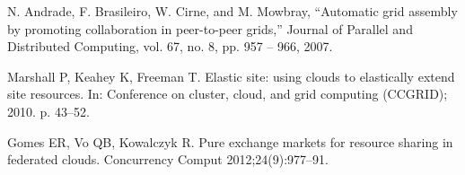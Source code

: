 \documentclass{article}
\begin{document}
\begin{thebibliography}{9}

N. Andrade, F. Brasileiro, W. Cirne, and M. Mowbray, “Automatic grid
assembly by promoting collaboration in peer-to-peer grids,” Journal of
Parallel and Distributed Computing, vol. 67, no. 8, pp. 957 – 966, 2007.

Marshall P, Keahey K, Freeman T. Elastic site: using clouds to elastically extend site resources. In: Conference on cluster, cloud, and grid computing
(CCGRID); 2010. p. 43–52.

Gomes ER, Vo QB, Kowalczyk R. Pure exchange markets for resource sharing in federated clouds. Concurrency Comput 2012;24(9):977–91.
\end{thebibliography}
    
\end{document}
